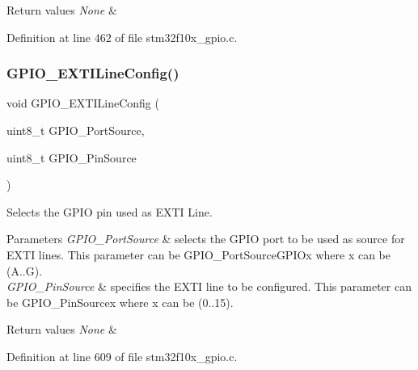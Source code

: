 \begin{DoxyRetVals}{Return values}
{\em None} & \\
\hline
\end{DoxyRetVals}


Definition at line 462 of file stm32f10x\+\_\+gpio.\+c.

\mbox{\label{group___g_p_i_o___private___functions_ga8c1f13646d7418827378032a584da653}} 
\subsubsection{\texorpdfstring{G\+P\+I\+O\+\_\+\+E\+X\+T\+I\+Line\+Config()}{GPIO\_EXTILineConfig()}}
{\footnotesize\ttfamily void G\+P\+I\+O\+\_\+\+E\+X\+T\+I\+Line\+Config (\begin{DoxyParamCaption}\item[{uint8\+\_\+t}]{G\+P\+I\+O\+\_\+\+Port\+Source,  }\item[{uint8\+\_\+t}]{G\+P\+I\+O\+\_\+\+Pin\+Source }\end{DoxyParamCaption})}



Selects the G\+P\+IO pin used as E\+X\+TI Line. 


\begin{DoxyParams}{Parameters}
{\em G\+P\+I\+O\+\_\+\+Port\+Source} & selects the G\+P\+IO port to be used as source for E\+X\+TI lines. This parameter can be G\+P\+I\+O\+\_\+\+Port\+Source\+G\+P\+I\+Ox where x can be (A..G). \\
\hline
{\em G\+P\+I\+O\+\_\+\+Pin\+Source} & specifies the E\+X\+TI line to be configured. This parameter can be G\+P\+I\+O\+\_\+\+Pin\+Sourcex where x can be (0..15). \\
\hline
\end{DoxyParams}

\begin{DoxyRetVals}{Return values}
{\em None} & \\
\hline
\end{DoxyRetVals}


Definition at line 609 of file stm32f10x\+\_\+gpio.\+c.

